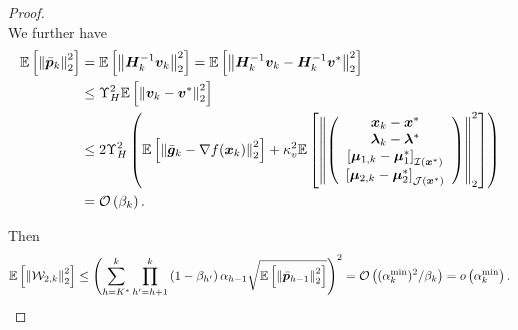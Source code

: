 \documentclass[aos]{imsart}
\numberwithin{equation}{section}
\theoremstyle{plain}
\begin{document}
\begin{appendix}
\begin{proof}
\begin{equation*}
    \end{equation*}
    We further have
    \begin{equation}
    \label{eq33}
        \begin{split}
            \mathbb{E} \left[\left\| \Bar{\bm{p}}_{k}\right\|_2^2 \right] & =  \mathbb{E} \left[\left\| \bm{H}_{k}^{-1} \bm{v}_{k}\right\|_2^2 \right] = \mathbb{E} \left[\left\| \bm{H}_{k}^{-1} \bm{v}_{k} - \bm{H}_{k}^{-1} \bm{v}^{*} \right\|_2^2 \right] \\
            & \leq \Upsilon_{H}^{2} \mathbb{E} \left[\left\|  \bm{v}_{k} - \bm{v}^{*} \right\|_2^2 \right] \\
            & \leq 2 \Upsilon_{H}^{2}  \left( \mathbb{E} \left[\left\| \Bar{\bm{g}}_k - \nabla f(\bm{x}_{k}) \right\|_2^2 \right] + \kappa_{v}^2 \mathbb{E} \left[ \left\|  \left( \begin{array}{c}
    \bm{x}_{k} - \bm{x}^{*}  \\
    \bm{\lambda}_{k} - \bm{\lambda}^{*} \\
    \left[ \bm{\mu}_{1,k} - \bm{\mu}_{1}^{*}\right]_{\mathcal{I}(\bm{x}^{*})} \\
    \left[ \bm{\mu}_{2,k} - \bm{\mu}_{2}^{*} \right]_{\mathcal{J}(\bm{x}^{*})} 
    \end{array} \right)  \right\|_2^2 \right]\right) \\
    & = \mathcal{O} \left( \beta_k \right).
        \end{split}
    \end{equation}

    Then 
    \begin{equation*}
        \begin{split}
            \mathbb{E} \left[ \left\|\mathcal{W}_{2,k} \right\|_2^2 \right] \leq \left( \sum_{h=K^{*}}^{k} \prod_{h^{\prime}=h+1}^{k} \left( 1- \beta_{h^{\prime}} \right) \alpha_{h-1} \sqrt{\mathbb{E} \left[\left\| \Bar{\bm{p}}_{h-1} \right\|_2^2 \right]} \right)^2 = \mathcal{O} \left(  (\alpha^{\min}_k)^2 / \beta_k \right) = o\left( \alpha^{\min}_k \right).
        \end{split}
    \end{equation*}
\end{proof}




\end{appendix}
\end{document}
